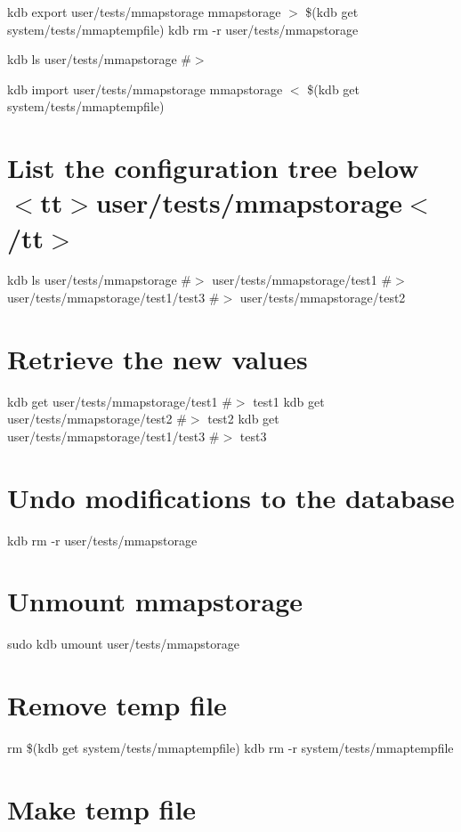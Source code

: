 kdb export user/tests/mmapstorage mmapstorage $>$ \$(kdb get system/tests/mmaptempfile) kdb rm -\/r user/tests/mmapstorage

kdb ls user/tests/mmapstorage \#$>$

kdb import user/tests/mmapstorage mmapstorage $<$ \$(kdb get system/tests/mmaptempfile)\hypertarget{autotoc_md442_autotoc_md449}{}\section{List the configuration tree below $<$tt$>$user/tests/mmapstorage$<$/tt$>$}\label{autotoc_md442_autotoc_md449}
kdb ls user/tests/mmapstorage \#$>$ user/tests/mmapstorage/test1 \#$>$ user/tests/mmapstorage/test1/test3 \#$>$ user/tests/mmapstorage/test2\hypertarget{autotoc_md442_autotoc_md450}{}\section{Retrieve the new values}\label{autotoc_md442_autotoc_md450}
kdb get user/tests/mmapstorage/test1 \#$>$ test1 kdb get user/tests/mmapstorage/test2 \#$>$ test2 kdb get user/tests/mmapstorage/test1/test3 \#$>$ test3\hypertarget{autotoc_md442_autotoc_md451}{}\section{Undo modifications to the database}\label{autotoc_md442_autotoc_md451}
kdb rm -\/r user/tests/mmapstorage\hypertarget{autotoc_md442_autotoc_md452}{}\section{Unmount mmapstorage}\label{autotoc_md442_autotoc_md452}
sudo kdb umount user/tests/mmapstorage\hypertarget{autotoc_md442_autotoc_md453}{}\section{Remove temp file}\label{autotoc_md442_autotoc_md453}
rm \$(kdb get system/tests/mmaptempfile) kdb rm -\/r system/tests/mmaptempfile 
\begin{DoxyCode}{0}
\end{DoxyCode}
 \hypertarget{autotoc_md442_autotoc_md454}{}\section{Make temp file}\label{autotoc_md442_autotoc_md454}

